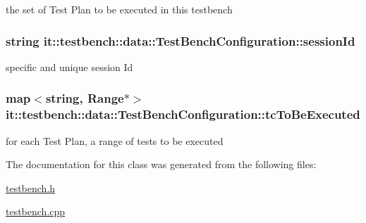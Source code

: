the set of Test Plan to be executed in this testbench \hypertarget{classit_1_1testbench_1_1data_1_1TestBenchConfiguration_a3fb6f36b584fee53c0d5e38d8095201d}{
\subsubsection[{session\-Id}]{\setlength{\rightskip}{0pt plus 5cm}string it\-::testbench\-::data\-::\-Test\-Bench\-Configuration\-::session\-Id\hspace{0.3cm}{\ttfamily [private]}}}\label{d5/daa/classit_1_1testbench_1_1data_1_1TestBenchConfiguration_a3fb6f36b584fee53c0d5e38d8095201d}
specific and unique session Id \hypertarget{classit_1_1testbench_1_1data_1_1TestBenchConfiguration_aba40dc49cadad99daa3cce208c5507b1}{
\subsubsection[{tc\-To\-Be\-Executed}]{\setlength{\rightskip}{0pt plus 5cm}map$<$string, {\bf Range}$\ast$$>$ it\-::testbench\-::data\-::\-Test\-Bench\-Configuration\-::tc\-To\-Be\-Executed\hspace{0.3cm}{\ttfamily [private]}}}\label{d5/daa/classit_1_1testbench_1_1data_1_1TestBenchConfiguration_aba40dc49cadad99daa3cce208c5507b1}
for each Test Plan, a range of tests to be executed 

The documentation for this class was generated from the following files\-:\begin{DoxyCompactItemize}
\item 
\hyperlink{testbench_8h}{testbench.\-h}\item 
\hyperlink{testbench_8cpp}{testbench.\-cpp}\end{DoxyCompactItemize}
